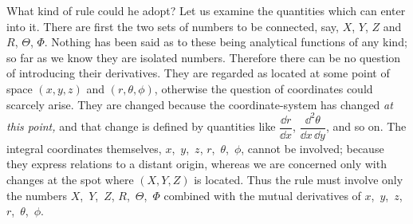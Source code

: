 \documentclass[12pt]{book}
\begin{document}
What kind of rule could he adopt? Let us examine the quantities which
can enter into it. There are first the two sets of numbers to be connected,
say, $X$, $Y$, $Z$ and $R$, $\Theta$, $\Phi$. Nothing has been said as to these being analytical
functions of any kind; so far as we know they are isolated numbers. Therefore
there can be no question of introducing their derivatives. They are regarded
as located at some point of space $(x, y, z)$ and $(r, \theta, \phi)$, otherwise the question
of coordinates could scarcely arise. They are changed because the coordinate\hyp{}system
has changed \emph{at this point,} and that change is defined by quantities like
$\dfrac{\dd r}{\dd x}$, $\dfrac{\dd^{2}\theta}{\dd x\, \dd y}$, and so on. The integral coordinates themselves, $x$,~$y$,~$z$, $r$,~$\theta$,~$\phi$,
cannot be involved; because they express relations to a distant origin, whereas
we are concerned only with changes at the spot where $(X, Y, Z)$ is located.
Thus the rule must involve only the numbers $X$,~$Y$,~$Z$, $R$,~$\Theta$,~$\Phi$ combined
with the mutual derivatives of $x$,~$y$,~$z$, $r$,~$\theta$,~$\phi$.
\end{document}
